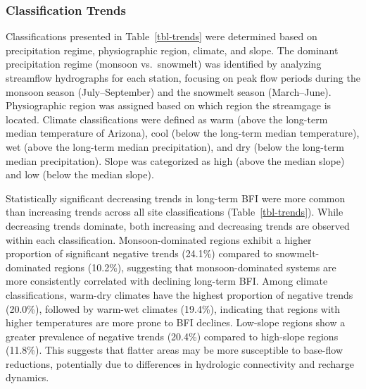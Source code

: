 \documentclass[
  authoryear,
  preprint,
  1p,
  onecolumn]{elsarticle}
\begin{document}
\subsubsection{Classification Trends}\label{classification-trends}

Classifications presented in Table~\ref{tbl-trends} were determined
based on precipitation regime, physiographic region, climate, and slope.
The dominant precipitation regime (monsoon vs.~snowmelt) was identified
by analyzing streamflow hydrographs for each station, focusing on peak
flow periods during the monsoon season (July--September) and the
snowmelt season (March--June). Physiographic region was assigned based
on which region the streamgage is located. Climate classifications were
defined as warm (above the long-term median temperature of Arizona),
cool (below the long-term median temperature), wet (above the long-term
median precipitation), and dry (below the long-term median
precipitation). Slope was categorized as high (above the median slope)
and low (below the median slope).

Statistically significant decreasing trends in long-term BFI were more
common than increasing trends across all site classifications
(Table~\ref{tbl-trends}). While decreasing trends dominate, both
increasing and decreasing trends are observed within each
classification. Monsoon-dominated regions exhibit a higher proportion of
significant negative trends (24.1\%) compared to snowmelt-dominated
regions (10.2\%), suggesting that monsoon-dominated systems are more
consistently correlated with declining long-term BFI. Among climate
classifications, warm-dry climates have the highest proportion of
negative trends (20.0\%), followed by warm-wet climates (19.4\%),
indicating that regions with higher temperatures are more prone to BFI
declines. Low-slope regions show a greater prevalence of negative trends
(20.4\%) compared to high-slope regions (11.8\%). This suggests that
flatter areas may be more susceptible to base-flow reductions,
potentially due to differences in hydrologic connectivity and recharge
dynamics.
\end{document}
